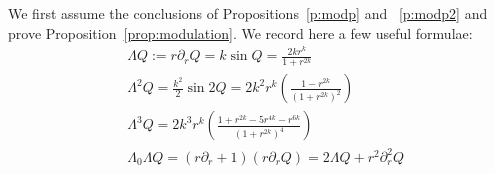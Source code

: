 \documentclass[10pt,reqno]{amsart}
\newcommand{\A}{\mathcal{A}}
\newcommand{\la}{\lambda}
\newcommand{\La}{\Lambda}
\newcommand{\p}{\partial}
\newcommand{\EQ}[1]{\begin{equation}\begin{split} #1 \end{split}\end{equation}}
\numberwithin{equation}{section}
\theoremstyle{remark}
\newcommand{\dd}[1]{\frac{\ud}{\ud{#1}}}
\newcommand{\ula}{\underline{\lambda}}
\newcommand{\ud}{\mathrm{d}}
\newcommand{\0}{\emptyset}
\begin{document}
We first assume the conclusions of Propositions~\ref{p:modp} and ~\ref{p:modp2} and prove Proposition~\ref{prop:modulation}. 
We record here a few useful formulae:
% 
\begin{align}
&\La Q:= r \p_r Q = k \sin Q  =  \frac{2k r^k}{ 1+ r^{2k}}  \label{eq:LaQ}\\
& \La^2 Q = \frac{k^{2}}{2} \sin 2 Q = 2k^2 r^k \left(\frac{ 1-r^{2k}}{ (1 + r^{2k})^2} \right) \label{eq:La2Q} \\ 
&\La^3 Q  =2k^3 r^k \left( \frac{1+ r^{2k} - 5r^{4k} - r^{6k}}{(1+r^{2k})^4}\right) \label{eq:La3Q} \\
& \La_0 \La Q = ( r\p_r +1)(r \p_r Q) = 2 \La Q + r^2 \p_r^2 Q \label{eq:DLa} \\
\end{align} 
\end{document}

